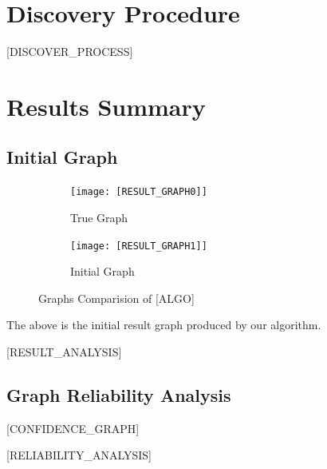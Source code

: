 \documentclass{article}
\begin{document}
\section{Discovery Procedure}
[DISCOVER_PROCESS]

\section{Results Summary}

\subsection{Initial Graph}

\begin{figure}[H]
    \centering
    \begin{subfigure}{0.45\textwidth}
        \centering
        \vspace{-0.5cm}
        \texttt{[image: [RESULT\_GRAPH0]]}
        \vfill
        \caption{True Graph}
        \label{fig:sub1}
    \end{subfigure}
    \hspace{0.04\textwidth}
    \begin{subfigure}{0.45\textwidth}
        \centering
        \vspace{-0.5cm}
        \texttt{[image: [RESULT\_GRAPH1]]}
        \vfill
        \caption{Initial Graph}
        \label{fig:sub2}
    \end{subfigure}
    \label{fig:main}
    \caption{Graphs Comparision of [ALGO]}
\end{figure}

The above is the initial result graph produced by our algorithm.

[RESULT_ANALYSIS]

\subsection{Graph Reliability Analysis}

[CONFIDENCE_GRAPH]

[RELIABILITY_ANALYSIS]

\end{document}
